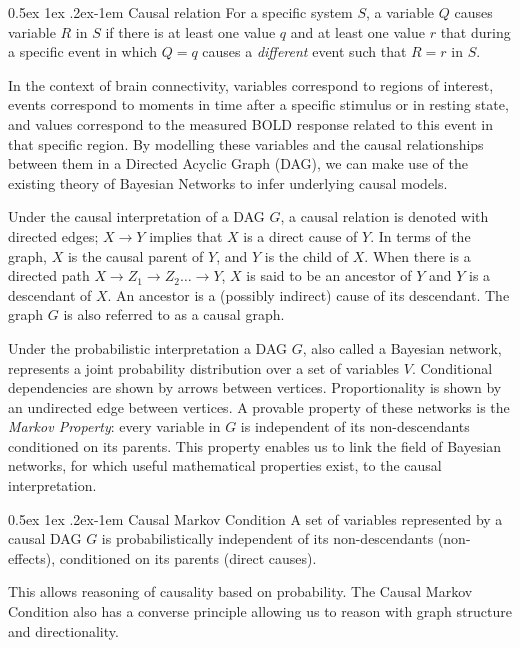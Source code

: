 \documentclass[a4paper, 10pt, english, onecolumn]{article}
\makeatletter
\renewcommand{\paragraph}{%
  \@startsection{paragraph}{4}%
  {\z@}{0.5ex \@plus 1ex \@minus .2ex}{-1em}%
  {\normalfont\normalsize\bfseries}%
}
\makeatother
\begin{document}
\paragraph{Causal relation}
For a specific system $S$, a variable $Q$ causes variable $R$ in $S$ if there is at least one value $q$ and at least one value $r$ that during a specific event in which $Q=q$ causes a \textit{different} event such that $R = r$ in $S$\cite[p.21]{spirtes2000}.

In the context of brain connectivity, variables correspond to regions of interest, events correspond to moments in time after a specific stimulus or in resting state, and values correspond to the measured BOLD response related to this event in that specific region.
By modelling these variables and the causal relationships between them in a Directed Acyclic Graph (DAG), we can make use of the existing theory of Bayesian Networks to infer underlying causal models.

Under the causal interpretation of a DAG $G$, a causal relation is denoted with directed edges; $X \rightarrow Y$ implies that $X$ is a direct cause of $Y$.
In terms of the graph, $X$ is the causal parent of $Y$, and $Y$ is the child of $X$. 
When there is a directed path $X \rightarrow Z_1 \rightarrow Z_2 \dots \rightarrow Y$, $X$ is said to be an ancestor of $Y$ and $Y$ is a descendant of $X$.
An ancestor is a (possibly indirect) cause of its descendant.
The graph $G$ is also referred to as a causal graph.

Under the probabilistic interpretation a DAG $G$, also called a Bayesian network, represents a joint probability distribution over a set of variables $V$.
Conditional dependencies are shown by arrows between vertices.
Proportionality is shown by an undirected edge between vertices.
A provable property of these networks is the \textit{Markov Property}: every variable in $G$ is independent of its non-descendants conditioned on its parents.
This property enables us to link the field of Bayesian networks, for which useful mathematical properties exist, to the causal interpretation.

\paragraph{Causal Markov Condition}
A set of variables represented by a causal DAG $G$ is probabilistically independent of its non-descendants (non-effects), conditioned on its parents (direct causes).

This allows reasoning of causality based on probability.
The Causal Markov Condition also has a converse principle allowing us to reason with graph structure and directionality.
\end{document}
